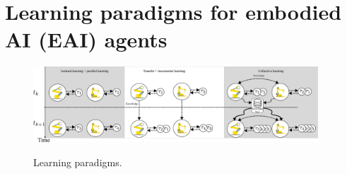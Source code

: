 %
%

\section{Learning paradigms for embodied AI (EAI) agents}
\begin{figure}[!t]
	\centering
	\hspace*{\fill}
	\includegraphics[width= 0.95\textwidth]{fig/learning_paradigms_v3.pdf} \label{fig:isolated_learning}
	\hspace*{\fill}
	\caption[] {\label{fig:learning_paradigms} Learning paradigms.}
\end{figure}
